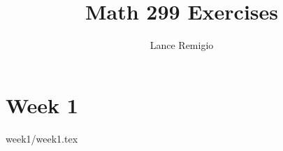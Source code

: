 \documentclass[a4paper]{article}
\title{Math 299 Exercises}
\author{Lance Remigio}
\begin{document}
\maketitle    
\tableofcontents

\section{Week 1}

{week1/week1.tex}
\end{document}
